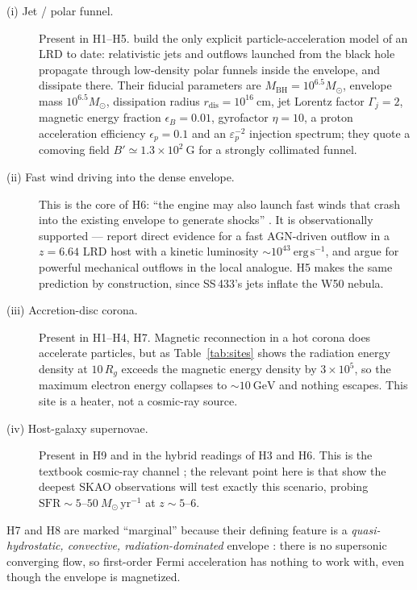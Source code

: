 \documentclass[11pt,a4paper]{article}
\newcommand{\ergs}{\ \mathrm{erg\,s^{-1}}}
\begin{document}
\begin{description}
\item[(i) Jet / polar funnel.] Present in H1--H5. \citet{Kuze2026} build the
only explicit particle-acceleration model of an LRD to date: relativistic jets
and outflows launched from the black hole propagate through low-density polar
funnels inside the envelope, and dissipate there. Their fiducial parameters are
$M_{\mathrm{BH}}=10^{6.5}M_\odot$, envelope mass $10^{6.5}M_\odot$,
dissipation radius $r_{\mathrm{dis}}=10^{16}\ \mathrm{cm}$, jet Lorentz factor
$\Gamma_j=2$, magnetic energy fraction $\epsilon_B=0.01$, gyrofactor $\eta=10$,
a proton acceleration efficiency $\epsilon_p=0.1$ and an
$\varepsilon_p^{-2}$ injection spectrum; they quote a comoving field
$B'\simeq1.3\times10^{2}\ \mathrm{G}$ for a strongly collimated funnel.

\item[(ii) Fast wind driving into the dense envelope.] This is the core of H6:
``the engine may also launch fast winds that crash into the existing envelope to
generate shocks'' \citep{Naidu2026}. It is observationally supported ---
\citet{Korber2026} report direct evidence for a fast AGN-driven outflow in a
$z=6.64$ LRD host with a kinetic luminosity $\sim\!10^{43}\ergs$, and
\citet{Rodriguez2026} argue for powerful mechanical outflows in the local
analogue. H5 makes the same prediction by construction, since SS\,433's
jets inflate the W50 nebula.

\item[(iii) Accretion-disc corona.] Present in H1--H4, H7. Magnetic reconnection
in a hot corona does accelerate particles, but as Table~\ref{tab:sites} shows
the radiation energy density at $10\,R_g$ exceeds the magnetic energy density by
$3\times10^{5}$, so the maximum electron energy collapses to $\sim\!10\
\mathrm{GeV}$ and nothing escapes. This site is a heater, not a cosmic-ray
source.

\item[(iv) Host-galaxy supernovae.] Present in H9 and in the hybrid readings of
H3 and H6. This is the textbook cosmic-ray channel \citep{Bell1978,
BlandfordOstriker1978,Drury1983}; the relevant point here is that
\citet{Mazzolari2026} show the deepest SKAO observations will test exactly this
scenario, probing $\mathrm{SFR}\sim5$--$50\ M_\odot\,\mathrm{yr^{-1}}$ at
$z\sim5$--$6$.
\end{description}

H7 and H8 are marked ``marginal'' because their defining feature is a
\emph{quasi-hydrostatic, convective, radiation-dominated} envelope
\citep{Pacucci2026,Gentile2026,AmaroSeoane2026}: there is no supersonic
converging flow, so first-order Fermi acceleration has nothing to work with,
even though the envelope is magnetized.
\end{document}
